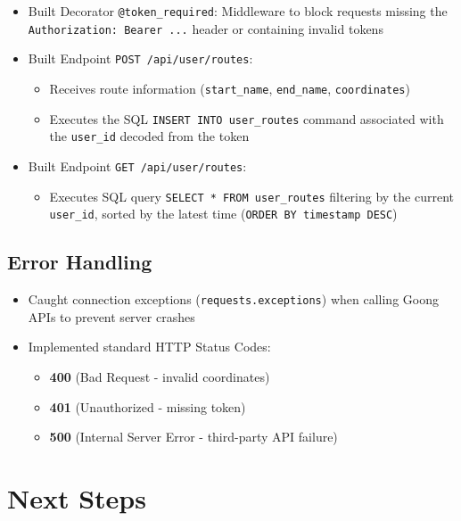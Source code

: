 \begin{itemize}
    \item Built Decorator \texttt{@token\_required}: Middleware to block requests missing the \texttt{Authorization: Bearer ...} header or containing invalid tokens
    \item Built Endpoint \texttt{POST /api/user/routes}:
    \begin{itemize}
        \item Receives route information (\texttt{start\_name}, \texttt{end\_name}, \texttt{coordinates})
        \item Executes the SQL \texttt{INSERT INTO user\_routes} command associated with the \texttt{user\_id} decoded from the token
    \end{itemize}
    \item Built Endpoint \texttt{GET /api/user/routes}:
    \begin{itemize}
        \item Executes SQL query \texttt{SELECT * FROM user\_routes} filtering by the current \texttt{user\_id}, sorted by the latest time (\texttt{ORDER BY timestamp DESC})
    \end{itemize}
\end{itemize}

\subsection{Error Handling}

\begin{itemize}
    \item Caught connection exceptions (\texttt{requests.exceptions}) when calling Goong APIs to prevent server crashes
    \item Implemented standard HTTP Status Codes:
    \begin{itemize}
        \item \textbf{400} (Bad Request - invalid coordinates)
        \item \textbf{401} (Unauthorized - missing token)
        \item \textbf{500} (Internal Server Error - third-party API failure)
    \end{itemize}
\end{itemize}

\section{Next Steps}

